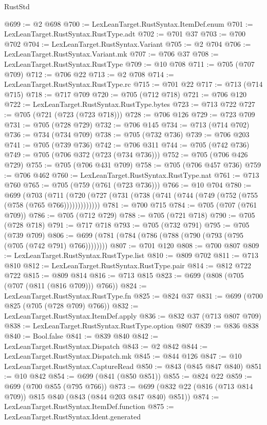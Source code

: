 \begin{lexlean}{RustStd}
\begin{coremodule}
@699 := @2 @698
@700 := LexLeanTarget.RustSyntax.ItemDef.enum
@701 := LexLeanTarget.RustSyntax.RustType.adt
@702 := @701 @37
@703 := @700 @702
@704 := LexLeanTarget.RustSyntax.Variant
@705 := @2 @704
@706 := LexLeanTarget.RustSyntax.Variant.mk
@707 := @706 @37
@708 := LexLeanTarget.RustSyntax.RustType
@709 := @10 @708
@711 := @705 (@707 @709)
@712 := @706 @22
@713 := @2 @708
@714 := LexLeanTarget.RustSyntax.RustType.rc
@715 := @701 @22
@717 := @713 (@714 @715)
@718 := @717 @709
@720 := @705 (@712 @718)
@721 := @706 @120
@722 := LexLeanTarget.RustSyntax.RustType.bytes
@723 := @713 @722
@727 := @705 (@721 (@723 (@723 @718)))
@728 := @706 @126
@729 := @723 @709
@731 := @705 (@728 @729)
@732 := @706 @145
@734 := @713 (@714 @702)
@736 := @734 (@734 @709)
@738 := @705 (@732 @736)
@739 := @706 @203
@741 := @705 (@739 @736)
@742 := @706 @311
@744 := @705 (@742 @736)
@749 := @705 (@706 @372 (@723 (@734 @736)))
@752 := @705 (@706 @426 @729)
@755 := @705 (@706 @431 @709)
@758 := @705 (@706 @457 @736)
@759 := @706 @462
@760 := LexLeanTarget.RustSyntax.RustType.nat
@761 := @713 @760
@765 := @705 (@759 (@761 (@723 @736)))
@766 := @10 @704
@780 := @699
    (@703 (@711 (@720 (@727 (@731 (@738 (@741 (@744 (@749 (@752 (@755 (@758 (@765 @766)))))))))))))
@781 := @700 @715
@784 := @705 (@707 (@761 @709))
@786 := @705 (@712 @729)
@788 := @705 (@721 @718)
@790 := @705 (@728 @718)
@791 := @717 @718
@793 := @705 (@732 @791)
@795 := @705 (@739 @709)
@806 := @699 (@781 (@784 (@786 (@788 (@790 (@793 (@795 (@705 (@742 @791) @766))))))))
@807 := @701 @120
@808 := @700 @807
@809 := LexLeanTarget.RustSyntax.RustType.list
@810 := @809 @702
@811 := @713 @810
@812 := LexLeanTarget.RustSyntax.RustType.pair
@814 := @812 @722 @722
@815 := @809 @814
@816 := @713 @815
@823 := @699 (@808 (@705 (@707 (@811 (@816 @709))) @766))
@824 := LexLeanTarget.RustSyntax.RustType.fn
@825 := @824 @37
@831 := @699 (@700 @825 (@705 (@728 @709) @766))
@832 := LexLeanTarget.RustSyntax.ItemDef.apply
@836 := @832 @37 (@713 @807 @709)
@838 := LexLeanTarget.RustSyntax.RustType.option @807
@839 := @836 @838
@840 := Bool.false
@841 := @839 @840
@842 := LexLeanTarget.RustSyntax.Dispatch
@843 := @2 @842
@844 := LexLeanTarget.RustSyntax.Dispatch.mk
@845 := @844 @126
@847 := @10 LexLeanTarget.RustSyntax.CaptureRead
@850 := @843 (@845 @847 @840)
@851 := @10 @842
@854 := @699 (@841 (@850 @851))
@855 := @824 @22
@859 := @699 (@700 @855 (@795 @766))
@873 := @699 (@832 @22 (@816 (@713 @814 @709)) @815 @840 (@843 (@844 @203 @847 @840) @851))
@874 := LexLeanTarget.RustSyntax.ItemDef.function
@875 := LexLeanTarget.RustSyntax.Ident.generated

\end{coremodule}
\end{lexlean}
